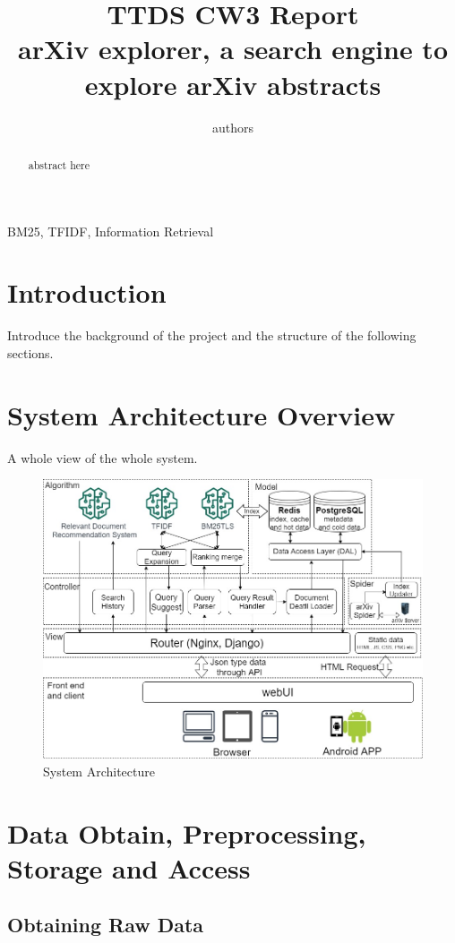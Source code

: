 \documentclass[conference]{IEEEtran}
\begin{document}
\title{TTDS CW3 Report\\
{arXiv explorer, a search engine to explore arXiv abstracts}}


\author{authors}

\maketitle

\begin{abstract}
abstract here
\end{abstract}

\begin{IEEEkeywords}
BM25, TFIDF, Information Retrieval
\end{IEEEkeywords}

\section{Introduction}
Introduce the background of the project and the structure of the following sections.

\section{System Architecture Overview}
A whole view of the whole system.
\begin{figure}[h]
\centering
\includegraphics[width=3.5 in]{fig/structure} 
\caption{System Architecture}
\label{SystemArchitecture}
\end{figure}

\section{Data Obtain, Preprocessing, Storage and Access}
\subsection{Obtaining Raw Data}
\end{document}
